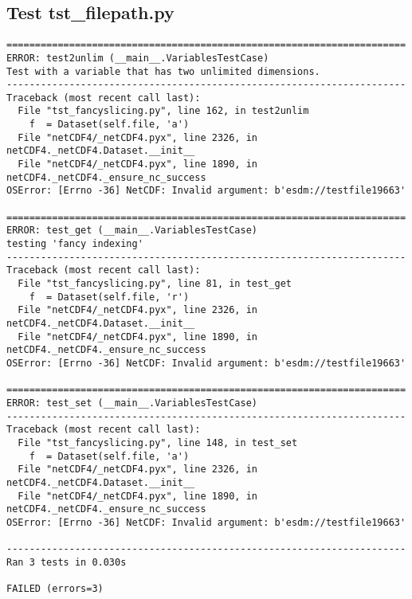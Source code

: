 \subsection{Test tst\_filepath.py}

\begin{verbatim}
======================================================================
ERROR: test2unlim (__main__.VariablesTestCase)
Test with a variable that has two unlimited dimensions.
----------------------------------------------------------------------
Traceback (most recent call last):
  File "tst_fancyslicing.py", line 162, in test2unlim
    f  = Dataset(self.file, 'a')
  File "netCDF4/_netCDF4.pyx", line 2326, in netCDF4._netCDF4.Dataset.__init__
  File "netCDF4/_netCDF4.pyx", line 1890, in netCDF4._netCDF4._ensure_nc_success
OSError: [Errno -36] NetCDF: Invalid argument: b'esdm://testfile19663'

======================================================================
ERROR: test_get (__main__.VariablesTestCase)
testing 'fancy indexing'
----------------------------------------------------------------------
Traceback (most recent call last):
  File "tst_fancyslicing.py", line 81, in test_get
    f  = Dataset(self.file, 'r')
  File "netCDF4/_netCDF4.pyx", line 2326, in netCDF4._netCDF4.Dataset.__init__
  File "netCDF4/_netCDF4.pyx", line 1890, in netCDF4._netCDF4._ensure_nc_success
OSError: [Errno -36] NetCDF: Invalid argument: b'esdm://testfile19663'

======================================================================
ERROR: test_set (__main__.VariablesTestCase)
----------------------------------------------------------------------
Traceback (most recent call last):
  File "tst_fancyslicing.py", line 148, in test_set
    f  = Dataset(self.file, 'a')
  File "netCDF4/_netCDF4.pyx", line 2326, in netCDF4._netCDF4.Dataset.__init__
  File "netCDF4/_netCDF4.pyx", line 1890, in netCDF4._netCDF4._ensure_nc_success
OSError: [Errno -36] NetCDF: Invalid argument: b'esdm://testfile19663'

----------------------------------------------------------------------
Ran 3 tests in 0.030s

FAILED (errors=3)


\end{verbatim}
